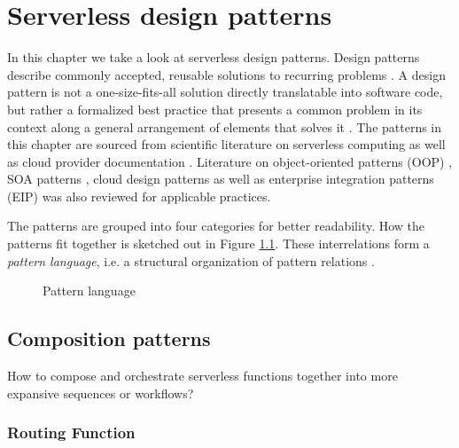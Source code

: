 \chapter{Serverless design patterns} \label{cha:patterns}

In this chapter we take a look at serverless design patterns. Design patterns describe commonly accepted, reusable solutions to recurring problems \parencite{hohpe2004enterprise}. A design pattern is not a one-size-fits-all solution directly translatable into software code, but rather a formalized best practice that presents a common problem in its context along a general arrangement of elements that solves it \parencite{gamma94designPatterns}. The patterns in this chapter are sourced from scientific literature on serverless computing as well as cloud provider documentation \parencite[][]{aws18serverlessLens, microsoft18cloudPatterns}. Literature on object-oriented patterns (OOP) \parencite{gamma94designPatterns}, SOA patterns \parencite{rotem12soa}, cloud design patterns \parencite{microsoft18cloudPatterns} as well as enterprise integration patterns (EIP) \parencite{hohpe2004enterprise} was also reviewed for applicable practices.

The patterns are grouped into four categories for better readability. How the patterns fit together is sketched out in Figure \ref{fig:patternLanguage}. These interrelations form a \textit{pattern language}, i.e. a structural organization of pattern relations \parencite{rotem12soa}.

\begin{figure}[h]
  \begin{center}
  \end{center}
  \caption{Pattern language}
  \label{fig:patternLanguage}
\end{figure}

\section{Composition patterns} \label{sec:compositionPatterns}

How to compose and orchestrate serverless functions together into more expansive sequences or workflows?

\subsection{Routing Function} \label{subsec:routingFunction}

